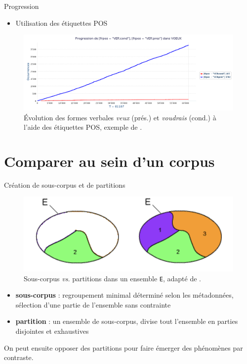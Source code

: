 \documentclass[xetex,xcolor={table,usenames,dvipsnames}]{beamer}
\newcommand{\bolder}[1]{{\color{purple}\bfseries#1}}
\begin{document}
\begin{frame}{Progression}
	\begin{itemize}
		\item Utilisation des étiquettes \textsc{POS}
	\end{itemize}
	\begin{figure}[h] %
		\centering
		\includegraphics[width=1\linewidth]{img/ver_cond_pres.png}
		\caption{Évolution des formes verbales \textit{veux} (prés.) et \textit{voudrais} (cond.) à l'aide des étiquettes \textsc{POS}, exemple de \textcite{lejeune2023}.}
		\label{fig:ling_out_TAL}
	\end{figure}
\end{frame}

\section{Comparer au sein d'un corpus}

\begin{frame}{Création de sous-corpus et de partitions}
		\begin{figure}[h] %
		\centering
		\includegraphics[width=.5\linewidth]{img/partition_sous-corpus.png}
		\caption{Sous-corpus \textit{vs.} partitions dans un ensemble \texttt{E}, adapté de \textcite{fort}.}
		\label{fig:ling_out_TAL}
	\end{figure}
	\begin{itemize}
		\item \bolder{sous-corpus} : regroupement \og{}minimal\fg{} déterminé selon les métadonnées, sélection d'une partie de l'ensemble sans contrainte
		\item \bolder{partition} : un ensemble de sous-corpus, divise tout l'ensemble en parties disjointes et exhaustives
	\end{itemize}
	On peut ensuite \og{}opposer\fg{} des partitions pour faire émerger des	phénomènes par contraste.
 
\end{frame}
\end{document}
